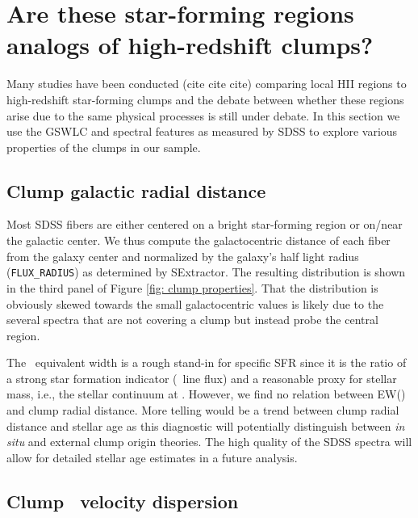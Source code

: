 


\section{Are these star-forming regions analogs of high-redshift clumps?}
Many studies have been conducted (cite cite cite) comparing local HII regions to high-redshift star-forming clumps and the debate between whether these regions arise due to the same physical processes is still under debate. In this section we use the GSWLC and spectral features as measured by SDSS to explore various properties of the clumps in our sample. 


\subsection{Clump galactic radial distance} \label{subsec:radii}

Most SDSS fibers are either centered on a bright star-forming region or on/near the galactic center. We thus compute the galactocentric distance of each fiber from the galaxy center and normalized by the galaxy's half light radius (\texttt{FLUX\_RADIUS}) as determined by SExtractor. The resulting distribution is shown in the third panel of Figure \ref{fig: clump properties}. That the distribution is obviously skewed towards the small galactocentric values is likely due to the several spectra that are not covering a clump but instead probe the central region.  

 The \ha~equivalent width is a rough stand-in for specific SFR since it is the ratio of a strong star formation indicator (\ha~line flux) and a reasonable proxy for stellar mass, i.e., the stellar continuum at \ha. However, we find no relation between EW(\ha) and clump radial distance. More telling would be a trend between clump radial distance and stellar age as this diagnostic will potentially distinguish between \textit{in situ} and external clump origin theories. The high quality of the SDSS spectra will allow for detailed stellar age estimates in a future analysis.  


\subsection{Clump \ha~velocity dispersion}


